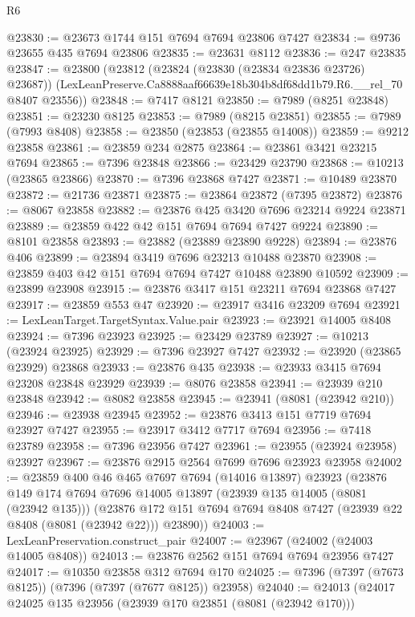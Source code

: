 \begin{lexlean}{R6}
\begin{coremodule}
@23830 := @23673 @1744 @151 @7694 @7694 @23806 @7427
@23834 := @9736 @23655 @435 @7694 @23806
@23835 := @23631 @8112
@23836 := @247 @23835
@23847 := @23800
    (@23812
      (@23824 (@23830 (@23834 @23836 @23726) @23687))
      (LexLeanPreserve.Ca8888aaf66639e18b304b8df68dd1b79.R6.__rel_70 @8407 @23556))
@23848 := @7417 @8121
@23850 := @7989 (@8251 @23848)
@23851 := @23230 @8125
@23853 := @7989 (@8215 @23851)
@23855 := @7989 (@7993 @8408)
@23858 := @23850 (@23853 (@23855 @14008))
@23859 := @9212 @23858
@23861 := @23859 @234 @2875
@23864 := @23861 @3421 @23215 @7694
@23865 := @7396 @23848
@23866 := @23429 @23790
@23868 := @10213 (@23865 @23866)
@23870 := @7396 @23868 @7427
@23871 := @10489 @23870
@23872 := @21736 @23871
@23875 := @23864 @23872 (@7395 @23872)
@23876 := @8067 @23858
@23882 := @23876 @425 @3420 @7696 @23214 @9224 @23871
@23889 := @23859 @422 @42 @151 @7694 @7694 @7427 @9224
@23890 := @8101 @23858
@23893 := @23882 (@23889 @23890 @9228)
@23894 := @23876 @406
@23899 := @23894 @3419 @7696 @23213 @10488 @23870
@23908 := @23859 @403 @42 @151 @7694 @7694 @7427 @10488 @23890 @10592
@23909 := @23899 @23908
@23915 := @23876 @3417 @151 @23211 @7694 @23868 @7427
@23917 := @23859 @553 @47
@23920 := @23917 @3416 @23209 @7694
@23921 := LexLeanTarget.TargetSyntax.Value.pair
@23923 := @23921 @14005 @8408
@23924 := @7396 @23923
@23925 := @23429 @23789
@23927 := @10213 (@23924 @23925)
@23929 := @7396 @23927 @7427
@23932 := @23920 (@23865 @23929) @23868
@23933 := @23876 @435
@23938 := @23933 @3415 @7694 @23208 @23848 @23929
@23939 := @8076 @23858
@23941 := @23939 @210 @23848
@23942 := @8082 @23858
@23945 := @23941 (@8081 (@23942 @210))
@23946 := @23938 @23945
@23952 := @23876 @3413 @151 @7719 @7694 @23927 @7427
@23955 := @23917 @3412 @7717 @7694
@23956 := @7418 @23789
@23958 := @7396 @23956 @7427
@23961 := @23955 (@23924 @23958) @23927
@23967 := @23876 @2915 @2564 @7699 @7696 @23923 @23958
@24002 := @23859
    @400
    @46
    @465
    @7697
    @7694
    (@14016 @13897)
    @23923
    (@23876
      @149
      @174
      @7694
      @7696
      @14005
      @13897
      (@23939 @135 @14005 (@8081 (@23942 @135)))
      (@23876 @172 @151 @7694 @7694 @8408 @7427 (@23939 @22 @8408 (@8081 (@23942 @22))) @23890))
@24003 := LexLeanPreservation.construct_pair
@24007 := @23967 (@24002 (@24003 @14005 @8408))
@24013 := @23876 @2562 @151 @7694 @7694 @23956 @7427
@24017 := @10350 @23858 @312 @7694 @170
@24025 := @7396 (@7397 (@7673 @8125)) (@7396 (@7397 (@7677 @8125)) @23958)
@24040 := @24013
    (@24017
      @24025
      @135
      @23956
      (@23939 @170 @23851 (@8081 (@23942 @170)))

\end{coremodule}
\end{lexlean}
